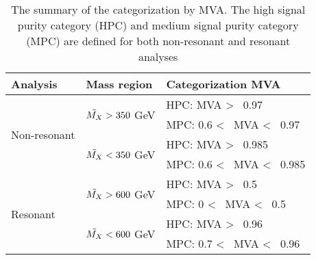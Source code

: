 \begin{table}[h]
\centering
\caption{The summary of the categorization by MVA. 
The high signal purity category (HPC) and medium signal purity category (MPC) are defined for both non-resonant and resonant analyses}
\label{tab:SummaryCat}
\begin{tabular}{lll}
\hline
Analysis                      & Mass region                & Categorization MVA                     \\ \hline
\multirow{4}{*}{Non-resonant} & \multirow{2}{*}{$\tilde{M_{X}}>350$ GeV} & HPC: MVA \textgreater~ 0.97             \\
                              &                            & MPC: 0.6 \textless~ MVA \textless~ 0.97  \\
                              & \multirow{2}{*}{$\tilde{M_{X}}<350$ GeV} & HPC: MVA \textgreater~ 0.985            \\
                              &                            & MPC: 0.6 \textless~ MVA \textless~ 0.985 \\ \hline
\multirow{4}{*}{Resonant}     & \multirow{2}{*}{$\tilde{M_{X}}>600$ GeV} & HPC: MVA \textgreater~ 0.5              \\
                              &                            & MPC: 0 \textless~ MVA \textless~ 0.5     \\
                              & \multirow{2}{*}{$\tilde{M_{X}}<600$ GeV} & HPC: MVA \textgreater~ 0.96             \\
                              &                            & MPC: 0.7 \textless~ MVA \textless~ 0.96  \\ \hline
\end{tabular}
\end{table}
